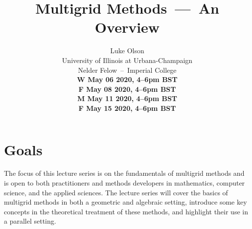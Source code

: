 \documentclass[article,letterpaper,11pt,oldfontcommands]{memoir}
\title{\usefont{T1}{qhv}{b}{n}\selectfont Multigrid Methods~---~An Overview}
\author{Luke Olson\\University of Illinois at Urbana-Champaign\\Nelder Felow~--~Imperial College\\
\medskip
\textbf{W May 06 2020, 4--6pm BST}\\
\textbf{F May 08 2020, 4--6pm BST}\\
\textbf{M May 11 2020, 4--6pm BST}\\
\textbf{F May 15 2020, 4--6pm BST}
}
\date{}
\begin{document}
\maketitle

\vspace{-1.5in}

%
%
%

\section*{Goals}

The focus of this lecture series is on the fundamentals of multigrid methods
and is open to both practitioners and methods developers in mathematics, computer
science, and the applied sciences. The lecture series will cover the basics of
multigrid methods in both a geometric and algebraic setting, introduce some key
concepts in the theoretical treatment of these methods, and highlight their use
in a parallel setting.
\end{document}
